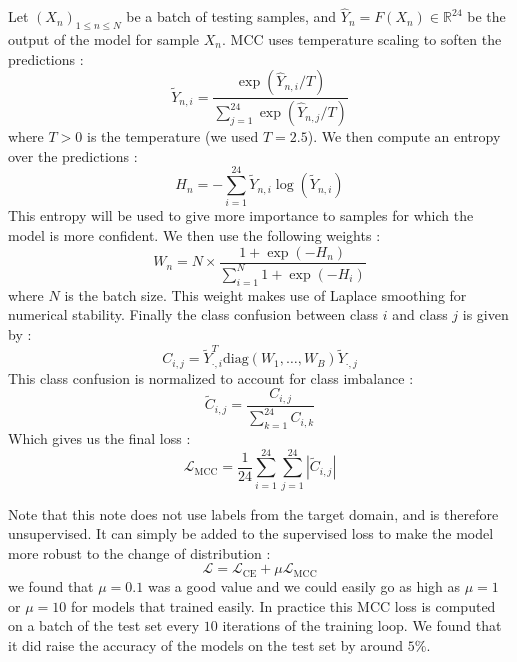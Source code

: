 \documentclass[switch, 11pt]{article}
\newcommand{\R}{\mathbb{R}}
\begin{document}
\begin{multicols}{2}
    Let $(X_n)_{1\leq n\leq N}$ be a batch of testing samples, and $\hat{Y}_n = F(X_n)\in\R^{24}$ be the output of the model for sample $X_n$. MCC uses temperature scaling to soften the predictions :
    \begin{equation}
        \tilde{Y}_{n,i} = \frac{\exp\left(\hat{Y}_{n,i}/T\right)}{\sum_{j=1}^{24}\exp\left(\hat{Y}_{n,j}/T\right)}
    \end{equation}
    where $T>0$ is the temperature (we used $T=2.5$). We then compute an entropy over the predictions :
    \begin{equation}
        H_n = -\sum_{i=1}^{24}\tilde{Y}_{n,i}\log\left(\tilde{Y}_{n,i}\right)
    \end{equation}
    This entropy will be used to give more importance to samples for which the model is more confident. We then use the following weights :
    \begin{equation}
        W_n = N\times\frac{1+\exp(-H_n)}{\sum_{i=1}^{N} 1+\exp(-H_i)}
    \end{equation}
    where $N$ is the batch size. This weight makes use of Laplace smoothing for numerical stability. Finally the class confusion between class $i$ and class $j$ is given by :
    \begin{equation}
        C_{i,j} = \tilde{Y}_{\cdot,i}^T \text{diag}(W_1,\dots,W_B) \tilde{Y}_{\cdot,j}
    \end{equation}
    This class confusion is normalized to account for class imbalance :
    \begin{equation}
        \tilde{C}_{i,j} = \frac{C_{i,j}}{\sum_{k=1}^{24}C_{i,k}}
    \end{equation}
    Which gives us the final loss :
    \begin{equation}
        \mathcal{L}_{\text{MCC}} = \frac{1}{24}\sum_{i=1}^{24}\sum_{j=1}^{24}\left|\tilde{C}_{i,j}\right|
    \end{equation}

    Note that this note does not use labels from the target domain, and is therefore unsupervised. It can simply be added to the supervised loss to make the model more robust to the change of distribution :
    \begin{equation}
        \mathcal{L} = \mathcal{L}_{\text{CE}} + \mu\mathcal{L}_{\text{MCC}}
    \end{equation}
    we found that $\mu=0.1$ was a good value and we could easily go as high as $\mu=1$ or $\mu=10$ for models that trained easily. In practice this MCC loss is computed on a batch of the test set every $10$ iterations of the training loop. We found that it did raise the accuracy of the models on the test set by around $5\%$.


\end{multicols}
\end{document}
